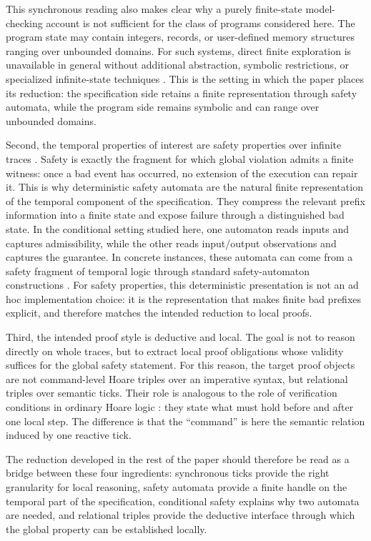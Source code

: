 \documentclass[acmsmall,screen]{acmart}
\theoremstyle{leftplain}
\theoremstyle{leftdefinition}
\theoremstyle{leftremark}
\begin{document}
This synchronous reading also makes clear why a purely finite-state
model-checking account is not sufficient for the class of programs considered
here. The program state may contain integers, records, or user-defined memory
structures ranging over unbounded domains. For such systems, direct finite
exploration is unavailable in general without additional abstraction,
symbolic restrictions, or specialized infinite-state techniques
\cite{bouajjani-pushdown,clarke-cegar}. This is the setting in which the paper
places its reduction: the specification side retains a finite representation
through safety automata, while the program side remains symbolic and can range
over unbounded domains.

Second, the temporal properties of interest are safety properties over infinite
traces \cite{alpern-schneider}. Safety is exactly the fragment for which global
violation admits a finite witness: once a bad event has occurred, no extension
of the execution can repair it. This is why deterministic safety automata are
the natural finite representation of the temporal component of the
specification. They compress the relevant prefix information into a finite
state and expose failure through a distinguished bad state. In the conditional
setting studied here, one automaton reads inputs and captures admissibility,
while the other reads input/output observations and captures the guarantee. In
concrete instances, these automata can come from a safety fragment of temporal
logic through standard safety-automaton constructions
\cite{kupferman-vardi-safety,gastin-oddoux}. For safety properties, this
deterministic presentation is not an ad hoc implementation choice: it is the
representation that makes finite bad prefixes explicit, and therefore matches
the intended reduction to local proofs.

Third, the intended proof style is deductive and local. The goal is not to
reason directly on whole traces, but to extract local proof obligations whose
validity suffices for the global safety statement. For this reason, the target
proof objects are not command-level Hoare triples over an imperative syntax,
but relational triples over semantic ticks. Their role is analogous to the
role of verification conditions in ordinary Hoare logic \cite{hoare-1969,
cook-1978}: they state what must hold before and after one local step. The
difference is that the ``command'' is here the semantic relation induced by one
reactive tick.

The reduction developed in the rest of the paper should therefore be read as a
bridge between these four ingredients: synchronous ticks provide the right
granularity for local reasoning, safety automata provide a finite handle on the
temporal part of the specification, conditional safety explains why two
automata are needed, and relational triples provide the deductive interface
through which the global property can be established locally.
\end{document}
